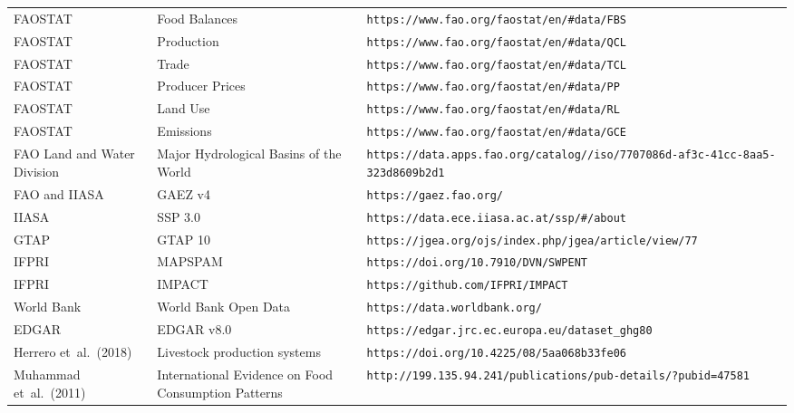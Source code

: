 \begin{xltabular}{\linewidth}{l X X}
  FAOSTAT~\cite{FAOSTATa} & Food Balances   & \nolinkurl{https://www.fao.org/faostat/en/\#data/FBS} \\
  FAOSTAT~\cite{FAOSTATa} & Production      & \nolinkurl{https://www.fao.org/faostat/en/\#data/QCL} \\
  FAOSTAT~\cite{FAOSTATa} & Trade           & \nolinkurl{https://www.fao.org/faostat/en/\#data/TCL} \\
  FAOSTAT~\cite{FAOSTATa} & Producer Prices & \nolinkurl{https://www.fao.org/faostat/en/\#data/PP} \\
  FAOSTAT~\cite{FAOSTATa} & Land Use        & \nolinkurl{https://www.fao.org/faostat/en/\#data/RL} \\
  FAOSTAT~\cite{FAOSTATa} & Emissions       & \nolinkurl{https://www.fao.org/faostat/en/\#data/GCE} \\
  FAO Land and Water Division~\cite{faolandandwaterdivisionMajorHydrologicalBasins2011} & Major Hydrological Basins of the World & \nolinkurl{https://data.apps.fao.org/catalog//iso/7707086d-af3c-41cc-8aa5-323d8609b2d1} \\
  FAO and IIASA~\cite{faoGlobalAgroEcologicalZones2025} & GAEZ v4   & \nolinkurl{https://gaez.fao.org/} \\
  IIASA & SSP 3.0          & \nolinkurl{https://data.ece.iiasa.ac.at/ssp/\#/about} \\
  GTAP~\cite{aguiarGTAPDataBase2019}  & GTAP 10          & \nolinkurl{https://jgea.org/ojs/index.php/jgea/article/view/77} \\
  IFPRI~\cite{internationalfoodpolicyresearchinstituteifpriGlobalSpatiallyDisaggregatedCrop2024} & MAPSPAM          & \nolinkurl{https://doi.org/10.7910/DVN/SWPENT} \\
  IFPRI~\cite{robinsonInternationalModelPolicy2015} & IMPACT          & \nolinkurl{https://github.com/IFPRI/IMPACT} \\
  World Bank & World Bank Open Data & \nolinkurl{https://data.worldbank.org/} \\
  EDGAR~\cite{europeancommissionjointresearchcentrejrcEDGAREmissionsDatabase2024} & EDGAR v8.0       & \nolinkurl{https://edgar.jrc.ec.europa.eu/dataset_ghg80} \\
  Herrero et~al.~(2018)~\cite{herreroLivestockProductionSystems2018} & Livestock production systems & \nolinkurl{https://doi.org/10.4225/08/5aa068b33fe06} \\
  Muhammad et~al.~(2011)~\cite{muhammadInternationalEvidenceFood2013}   & International Evidence on Food Consumption Patterns & \nolinkurl{http://199.135.94.241/publications/pub-details/?pubid=47581} \\

\end{xltabular}
